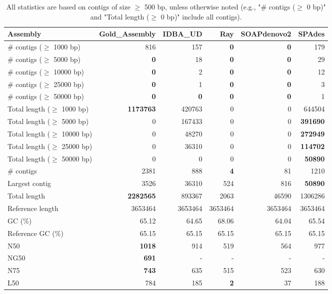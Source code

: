 \documentclass[12pt,a4paper]{article}
\begin{document}
\begin{table}[ht]
\begin{center}
\caption{All statistics are based on contigs of size $\geq$ 500 bp, unless otherwise noted (e.g., "\# contigs ($\geq$ 0 bp)" and "Total length ($\geq$ 0 bp)" include all contigs).}
\begin{tabular}{|l*{5}{|r}|}
\hline
Assembly & Gold\_Assembly & IDBA\_UD & Ray & SOAPdenovo2 & SPAdes \\ \hline
\# contigs ($\geq$ 1000 bp) & 816 & 157 & {\bf 0} & {\bf 0} & 179 \\ \hline
\# contigs ($\geq$ 5000 bp) & {\bf 0} & 18 & {\bf 0} & {\bf 0} & 29 \\ \hline
\# contigs ($\geq$ 10000 bp) & {\bf 0} & 2 & {\bf 0} & {\bf 0} & 12 \\ \hline
\# contigs ($\geq$ 25000 bp) & {\bf 0} & 1 & {\bf 0} & {\bf 0} & 3 \\ \hline
\# contigs ($\geq$ 50000 bp) & {\bf 0} & {\bf 0} & {\bf 0} & {\bf 0} & 1 \\ \hline
Total length ($\geq$ 1000 bp) & {\bf 1173763} & 420763 & 0 & 0 & 644504 \\ \hline
Total length ($\geq$ 5000 bp) & 0 & 167433 & 0 & 0 & {\bf 391690} \\ \hline
Total length ($\geq$ 10000 bp) & 0 & 48270 & 0 & 0 & {\bf 272949} \\ \hline
Total length ($\geq$ 25000 bp) & 0 & 36310 & 0 & 0 & {\bf 114702} \\ \hline
Total length ($\geq$ 50000 bp) & 0 & 0 & 0 & 0 & {\bf 50890} \\ \hline
\# contigs & 2381 & 888 & {\bf 4} & 81 & 1210 \\ \hline
Largest contig & 3526 & 36310 & 524 & 816 & {\bf 50890} \\ \hline
Total length & {\bf 2282565} & 893367 & 2063 & 46590 & 1306286 \\ \hline
Reference length & 3653464 & 3653464 & 3653464 & 3653464 & 3653464 \\ \hline
GC (\%) & 65.12 & 64.65 & 68.06 & 64.04 & 65.54 \\ \hline
Reference GC (\%) & 65.15 & 65.15 & 65.15 & 65.15 & 65.15 \\ \hline
N50 & {\bf 1018} & 914 & 519 & 564 & 977 \\ \hline
NG50 & {\bf 691} & - & - & - & - \\ \hline
N75 & {\bf 743} & 635 & 515 & 523 & 630 \\ \hline
L50 & 784 & 185 & {\bf 2} & 37 & 188 \\ \hline

\end{tabular}
\end{center}
\end{table}
\end{document}
